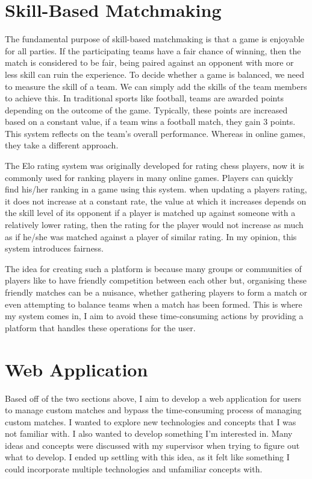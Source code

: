 \section{Skill-Based Matchmaking}
The fundamental purpose of skill-based matchmaking is that a game is enjoyable for all parties. \cite{graepel2006ranking} If the participating teams have a fair chance of winning, then the match is considered to be fair, being paired against an opponent with more or less skill can ruin the experience. \cite{alman2017theoretical} To decide whether a game is balanced, we need to measure the skill of a team. We can simply add the skills of the team members to achieve this. In traditional sports like football, teams are awarded points depending on the outcome of the game. Typically, these points are increased based on a constant value, if a team wins a football match, they gain 3 points. This system reflects on the team's overall performance. Whereas in online games, they take a different approach.\newline  

The Elo rating system \cite{pelanek2016applications} was originally developed for rating chess players, now it is commonly used for ranking players in many online games. Players can quickly find his/her ranking in a game using this system. when updating a players rating, it does not increase at a constant rate, the value at which it increases depends on the skill level of its opponent if a player is matched up against someone with a relatively lower rating, then the rating for the player would not increase as much as if he/she was matched against a player of similar rating. In my opinion, this system introduces fairness.\newline


The idea for creating such a platform is because many groups or communities of players like to have friendly competition between each other but, organising these friendly matches can be a nuisance, whether gathering players to form a match or even attempting to balance teams when a match has been formed. This is where my system comes in, I aim to avoid these time-consuming actions by providing a platform that handles these operations for the user.

\section{Web Application}
Based off of the two sections above, I aim to develop a web application for users to manage custom matches and bypass the time-consuming process of managing custom matches. I wanted to explore new technologies and concepts that I was not familiar with. I also wanted to develop something I'm interested in. Many ideas and concepts were discussed with my supervisor when trying to figure out what to develop. I ended up settling with this idea, as it felt like something I could incorporate multiple technologies and unfamiliar concepts with.\newline

